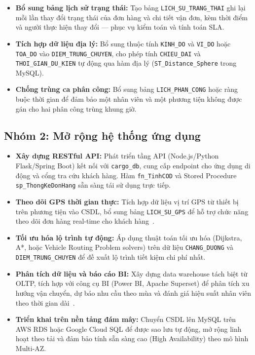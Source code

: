 \documentclass[11pt]{report}
\begin{document}
\begin{itemize}
    \item \textbf{Bổ sung bảng lịch sử trạng thái:} Tạo bảng \texttt{LICH\_SU\_TRANG\_THAI} ghi lại mỗi lần thay đổi trạng thái của đơn hàng và chi tiết vận đơn, kèm thời điểm và người thực hiện thay đổi --- phục vụ kiểm toán và tính toán SLA.

    \item \textbf{Tích hợp dữ liệu địa lý:} Bổ sung thuộc tính \texttt{KINH\_DO} và \texttt{VI\_DO} hoặc \texttt{TOA\_DO} vào \texttt{DIEM\_TRUNG\_CHUYEN}, cho phép tính \texttt{CHIEU\_DAI} và \texttt{THOI\_GIAN\_DU\_KIEN} tự động qua hàm địa lý (\texttt{ST\_Distance\_Sphere} trong MySQL).

    \item \textbf{Chống trùng ca phân công:} Bổ sung bảng \texttt{LICH\_PHAN\_CONG} hoặc ràng buộc thời gian để đảm bảo một nhân viên và một phương tiện không được gán cho hai phân công trùng khung giờ.
\end{itemize}

\subsection*{Nhóm 2: Mở rộng hệ thống ứng dụng}

\begin{itemize}
    \item \textbf{Xây dựng RESTful API:} Phát triển tầng API (Node.js/Python Flask/Spring Boot) kết nối với \texttt{cargo\_db}, cung cấp endpoint cho ứng dụng di động và cổng tra cứu khách hàng. Hàm \texttt{fn\_TinhCOD} và Stored Procedure \texttt{sp\_ThongKeDonHang} sẵn sàng tái sử dụng trực tiếp.

    \item \textbf{Theo dõi GPS thời gian thực:} Tích hợp dữ liệu vị trí GPS từ thiết bị trên phương tiện vào CSDL, bổ sung bảng \texttt{LICH\_SU\_GPS} để hỗ trợ chức năng theo dõi đơn hàng real-time cho khách hàng~\cite{ieee2019transport}.

    \item \textbf{Tối ưu hóa lộ trình tự động:} Áp dụng thuật toán tối ưu hóa (Dijkstra, A*, hoặc Vehicle Routing Problem solvers) trên dữ liệu \texttt{CHANG\_DUONG} và \texttt{DIEM\_TRUNG\_CHUYEN} để đề xuất lộ trình tiết kiệm chi phí nhất.

    \item \textbf{Phân tích dữ liệu và báo cáo BI:} Xây dựng data warehouse tách biệt từ OLTP, tích hợp với công cụ BI (Power BI, Apache Superset) để phân tích xu hướng vận chuyển, dự báo nhu cầu theo mùa và đánh giá hiệu suất nhân viên theo thời gian dài~\cite{bazaras2024multimodal}.

    \item \textbf{Triển khai trên nền tảng đám mây:} Chuyển CSDL lên MySQL trên AWS RDS hoặc Google Cloud SQL để được sao lưu tự động, mở rộng linh hoạt theo tải và đảm bảo tính sẵn sàng cao (High Availability) theo mô hình Multi-AZ.
\end{itemize}
\end{document}
